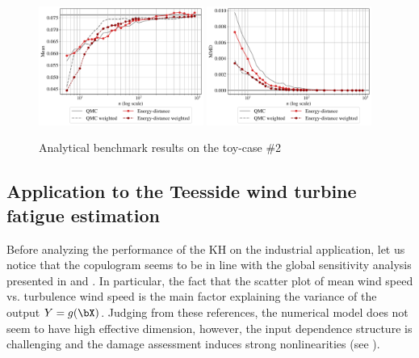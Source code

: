 \begin{figure}[!h]
\begin{center}
    \includegraphics[width=0.48\textwidth]{part2/figures/DCE/analytical_bench/GSobol 10D (normal input)_convergence_ED.pdf}
    \includegraphics[width=0.48\textwidth]{part2/figures/DCE/analytical_bench/GSobol 10D (normal input)_convergence_MMD_ED.pdf}\\
\end{center}
\caption{Analytical benchmark results on the toy-case \#2} \label{fig:toy-case2}
\end{figure}

\subsection{Application to the Teesside wind turbine fatigue estimation}

Before analyzing the performance of the KH on the industrial application, let us notice that the copulogram  seems to be in line with the global sensitivity analysis presented in \cite{murcia_dimitrov_2018} and \cite{li_zhan_2020}. 
In particular, the fact that the scatter plot of mean wind speed vs. turbulence wind speed is the main factor explaining the variance of the output $Y=g(\bX)$. 
Judging from these references, the numerical model does not seem to have high effective dimension, however, the input dependence structure is challenging and the damage assessment induces strong nonlinearities (see ). 

